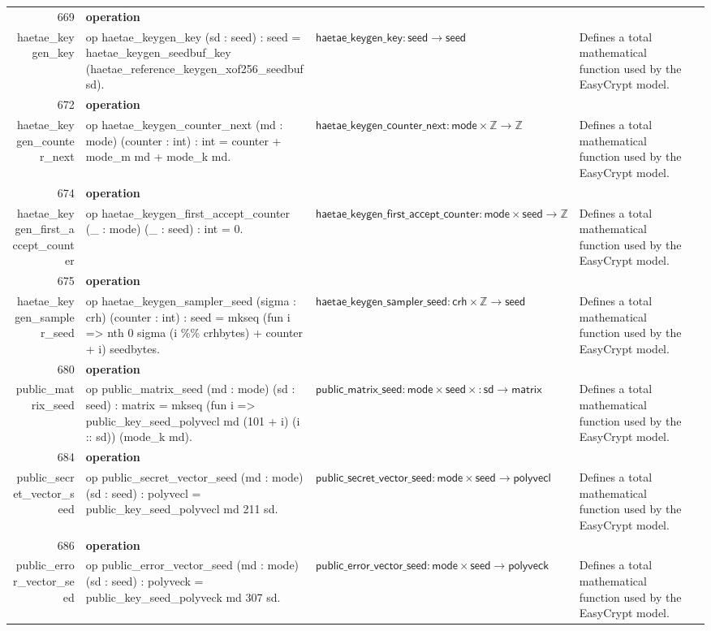 \documentclass[10pt]{article}
\newcommand{\ec}[1]{\begingroup\ttfamily\scriptsize #1\endgroup}
\begin{document}
\begin{longtable}{r L{0.17\textwidth} L{0.26\textwidth} L{0.27\textwidth} L{0.20\textwidth}}
669 & \textbf{operation}\\\ec{haetae\_keygen\_key} & \ec{op haetae\_keygen\_key (sd : seed) : seed = haetae\_keygen\_seedbuf\_key (haetae\_reference\_keygen\_xof256\_seedbuf sd).} & \(\mathsf{haetae\_keygen\_key} : \mathsf{seed} \to \mathsf{seed}\) & Defines a total mathematical function used by the EasyCrypt model. \\
672 & \textbf{operation}\\\ec{haetae\_keygen\_counter\_next} & \ec{op haetae\_keygen\_counter\_next (md : mode) (counter : int) : int = counter + mode\_m md + mode\_k md.} & \(\mathsf{haetae\_keygen\_counter\_next} : \mathsf{mode} \times \mathbb{Z} \to \mathbb{Z}\) & Defines a total mathematical function used by the EasyCrypt model. \\
674 & \textbf{operation}\\\ec{haetae\_keygen\_first\_accept\_counter} & \ec{op haetae\_keygen\_first\_accept\_counter (\_ : mode) (\_ : seed) : int = 0.} & \(\mathsf{haetae\_keygen\_first\_accept\_counter} : \mathsf{mode} \times \mathsf{seed} \to \mathbb{Z}\) & Defines a total mathematical function used by the EasyCrypt model. \\
675 & \textbf{operation}\\\ec{haetae\_keygen\_sampler\_seed} & \ec{op haetae\_keygen\_sampler\_seed (sigma : crh) (counter : int) : seed = mkseq (fun i => nth 0 sigma (i \%\% crhbytes) + counter + i) seedbytes.} & \(\mathsf{haetae\_keygen\_sampler\_seed} : \mathsf{crh} \times \mathbb{Z} \to \mathsf{seed}\) & Defines a total mathematical function used by the EasyCrypt model. \\
680 & \textbf{operation}\\\ec{public\_matrix\_seed} & \ec{op public\_matrix\_seed (md : mode) (sd : seed) : matrix = mkseq (fun i => public\_key\_seed\_polyvecl md (101 + i) (i :: sd)) (mode\_k md).} & \(\mathsf{public\_matrix\_seed} : \mathsf{mode} \times \mathsf{seed} \times \mathsf{: sd} \to \mathsf{matrix}\) & Defines a total mathematical function used by the EasyCrypt model. \\
684 & \textbf{operation}\\\ec{public\_secret\_vector\_seed} & \ec{op public\_secret\_vector\_seed (md : mode) (sd : seed) : polyvecl = public\_key\_seed\_polyvecl md 211 sd.} & \(\mathsf{public\_secret\_vector\_seed} : \mathsf{mode} \times \mathsf{seed} \to \mathsf{polyvecl}\) & Defines a total mathematical function used by the EasyCrypt model. \\
686 & \textbf{operation}\\\ec{public\_error\_vector\_seed} & \ec{op public\_error\_vector\_seed (md : mode) (sd : seed) : polyveck = public\_key\_seed\_polyveck md 307 sd.} & \(\mathsf{public\_error\_vector\_seed} : \mathsf{mode} \times \mathsf{seed} \to \mathsf{polyveck}\) & Defines a total mathematical function used by the EasyCrypt model. \\

\end{longtable}
\end{document}
